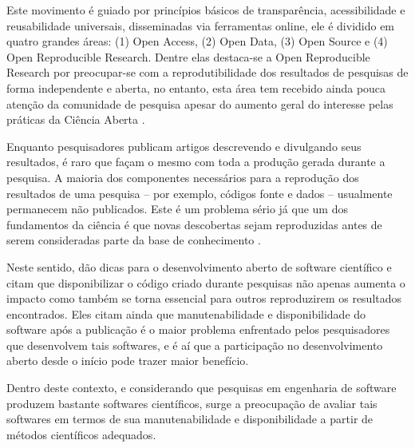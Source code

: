 Este movimento é guiado por princípios básicos de transparência, acessibilidade
e reusabilidade universais, disseminadas via ferramentas online, ele é dividido
em quatro grandes áreas: (1) Open Access, (2) Open Data, (3) Open Source e (4)
Open Reproducible Research. Dentre elas destaca-se a Open Reproducible Research
por preocupar-se com a reprodutibilidade dos resultados de pesquisas de forma
independente \cite{Stodden2009} e aberta, no entanto, esta área tem recebido
ainda pouca atenção da comunidade de pesquisa \cite{Nancy2015}
\cite{Grand2010Open} apesar do aumento geral do interesse pelas práticas da
Ciência Aberta \cite{Grand2010}.

Enquanto pesquisadores publicam artigos descrevendo e divulgando seus
resultados, é raro que façam o mesmo com toda a produção gerada durante a
pesquisa. A maioria dos componentes necessários para a reprodução dos
resultados de uma pesquisa -- por exemplo, códigos fonte e dados -- usualmente
permanecem não publicados. Este é um problema sério já que um dos fundamentos
da ciência é que novas descobertas sejam reproduzidas antes de serem
consideradas parte da base de conhecimento \cite{Stodden2009}.

Neste sentido,  dão dicas para o desenvolvimento aberto
de software científico e citam que disponibilizar o código criado durante
pesquisas não apenas aumenta o impacto como também se torna essencial para
outros reproduzirem os resultados encontrados. Eles citam ainda que
manutenabilidade e disponibilidade do software após a publicação é o maior
problema enfrentado pelos pesquisadores que desenvolvem tais softwares, e é aí
que a participação no desenvolvimento aberto desde o início pode trazer maior
benefício.

Dentro deste contexto, e considerando que pesquisas em engenharia de software
produzem bastante softwares científicos, surge a preocupação de avaliar tais
softwares em termos de sua manutenabilidade e disponibilidade a partir de
métodos científicos adequados.


